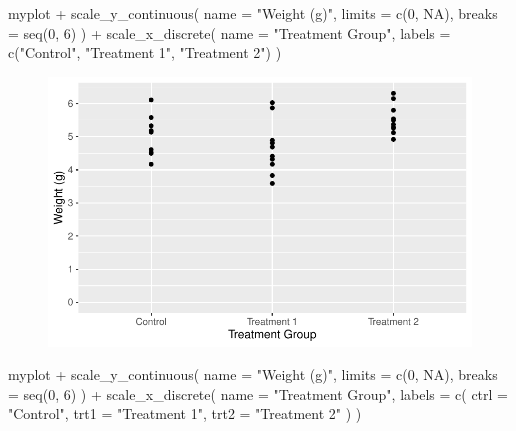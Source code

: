 \documentclass[
  letterpaper,
  DIV=11,
  numbers=noendperiod]{scrartcl}
\newenvironment{Shaded}{\begin{snugshade}}{\end{snugshade}}
\newcommand{\AttributeTok}[1]{\textcolor[rgb]{0.40,0.45,0.13}{#1}}
\newcommand{\ConstantTok}[1]{\textcolor[rgb]{0.56,0.35,0.01}{#1}}
\newcommand{\DecValTok}[1]{\textcolor[rgb]{0.68,0.00,0.00}{#1}}
\newcommand{\FunctionTok}[1]{\textcolor[rgb]{0.28,0.35,0.67}{#1}}
\newcommand{\NormalTok}[1]{\textcolor[rgb]{0.00,0.23,0.31}{#1}}
\newcommand{\SpecialCharTok}[1]{\textcolor[rgb]{0.37,0.37,0.37}{#1}}
\newcommand{\StringTok}[1]{\textcolor[rgb]{0.13,0.47,0.30}{#1}}
\begin{document}
\begin{Shaded}
\begin{Highlighting}[]
\NormalTok{myplot }\SpecialCharTok{+}
  \FunctionTok{scale\_y\_continuous}\NormalTok{(}
    \AttributeTok{name =} \StringTok{"Weight (g)"}\NormalTok{,}
    \AttributeTok{limits =} \FunctionTok{c}\NormalTok{(}\DecValTok{0}\NormalTok{, }\ConstantTok{NA}\NormalTok{),}
    \AttributeTok{breaks =} \FunctionTok{seq}\NormalTok{(}\DecValTok{0}\NormalTok{, }\DecValTok{6}\NormalTok{)}
\NormalTok{  ) }\SpecialCharTok{+}
  \FunctionTok{scale\_x\_discrete}\NormalTok{(}
    \AttributeTok{name =} \StringTok{"Treatment Group"}\NormalTok{,}
    \AttributeTok{labels =} \FunctionTok{c}\NormalTok{(}\StringTok{"Control"}\NormalTok{, }\StringTok{"Treatment 1"}\NormalTok{, }\StringTok{"Treatment 2"}\NormalTok{)}
\NormalTok{  )}
\end{Highlighting}
\end{Shaded}

\begin{figure}[H]

{\centering \includegraphics{ggplot2intro_files/figure-pdf/unnamed-chunk-12-1.pdf}

}

\end{figure}

\begin{Shaded}
\begin{Highlighting}[]
\NormalTok{myplot }\SpecialCharTok{+}
  \FunctionTok{scale\_y\_continuous}\NormalTok{(}
    \AttributeTok{name =} \StringTok{"Weight (g)"}\NormalTok{,}
    \AttributeTok{limits =} \FunctionTok{c}\NormalTok{(}\DecValTok{0}\NormalTok{, }\ConstantTok{NA}\NormalTok{),}
    \AttributeTok{breaks =} \FunctionTok{seq}\NormalTok{(}\DecValTok{0}\NormalTok{, }\DecValTok{6}\NormalTok{)}
\NormalTok{  ) }\SpecialCharTok{+}
  \FunctionTok{scale\_x\_discrete}\NormalTok{(}
    \AttributeTok{name =} \StringTok{"Treatment Group"}\NormalTok{,}
    \AttributeTok{labels =} \FunctionTok{c}\NormalTok{(}
      \AttributeTok{ctrl =} \StringTok{"Control"}\NormalTok{, }
      \AttributeTok{trt1 =} \StringTok{"Treatment 1"}\NormalTok{, }
      \AttributeTok{trt2 =} \StringTok{"Treatment 2"}
\NormalTok{    )}
\NormalTok{  )}
\end{Highlighting}
\end{Shaded}
\end{document}
